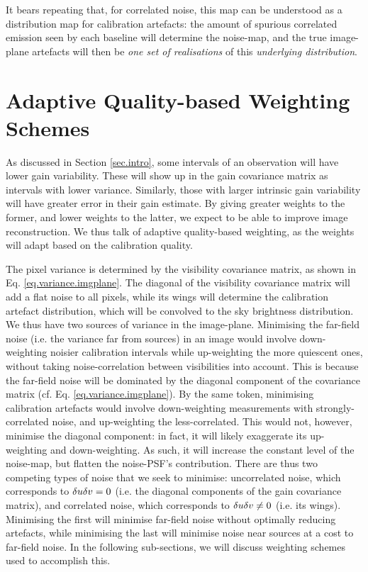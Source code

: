 \pg
It bears repeating that, for correlated noise, this map can be understood as a distribution map for calibration artefacts: the amount of spurious correlated emission seen by each baseline will determine the noise-map, and the true image-plane artefacts will then be \emph{one set of realisations} of this \emph{underlying distribution}.

\section{Adaptive Quality-based Weighting Schemes}\label{sec.DynamicRange}

\pg
As discussed in Section \ref{sec.intro}, some intervals of an observation will have lower gain variability. These will show up in the gain covariance matrix as intervals with lower variance. Similarly, those with larger intrinsic gain variability will have greater error in their gain estimate. By giving greater weights to the former, and lower weights to the latter, we expect to be able to improve image reconstruction. {We thus talk of adaptive quality-based weighting, as the weights will adapt based on the calibration quality.}

\pg
The pixel variance is determined by the visibility covariance matrix, as shown in Eq. \ref{eq.variance.imgplane}. The diagonal of the visibility covariance matrix will add a flat noise to all pixels, while its wings will determine the calibration artefact distribution, which will be convolved to the sky brightness distribution. We thus have two sources of variance in the image-plane.
Minimising the far-field noise (i.e. the variance far from sources) in an image would involve down-weighting noisier calibration intervals while up-weighting the more quiescent ones, without taking noise-correlation between visibilities into account. This is because the far-field noise will be dominated by the diagonal component of the covariance matrix (cf. Eq. \ref{eq.variance.imgplane}). By the same token, minimising calibration artefacts would involve down-weighting measurements with strongly-correlated noise, and up-weighting the less-correlated. This would not, however, minimise the diagonal component: in fact, it will likely exaggerate its up-weighting and down-weighting. As such, it will increase the constant level of the noise-map, but flatten the noise-PSF's contribution. There are thus two competing types of noise that we seek to minimise: uncorrelated noise, which corresponds to $\delta u \delta v=0$ (i.e. the diagonal components of the gain covariance matrix), and correlated noise, which corresponds to $\delta u \delta v\ne 0$ (i.e. its wings). Minimising the first will minimise far-field noise without optimally reducing artefacts, while minimising the last will minimise noise near sources at a cost to far-field noise. In the following sub-sections, we will discuss weighting schemes used to accomplish this.


